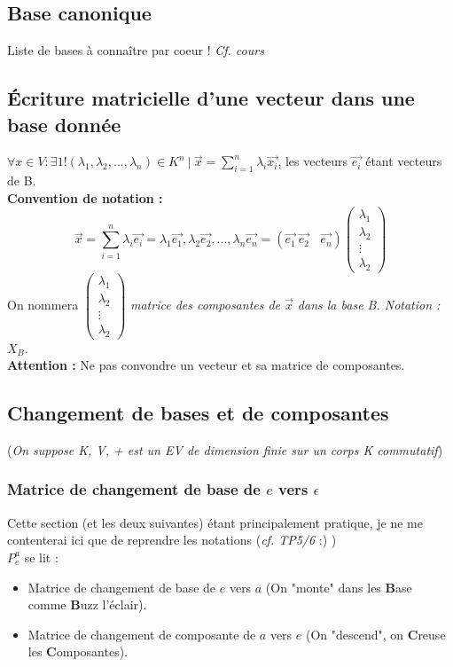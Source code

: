 \documentclass[12pt, a4paper, openany]{article}
\begin{document}
\subsection{Base canonique}
Liste de bases à connaître par coeur ! \textit{Cf. cours}

\subsection{Écriture matricielle d'une vecteur dans une base donnée}
$\forall x \in V : \exists 1!(\lambda_{1}, \lambda_{2}, ..., \lambda_{n}) \in K^{n}\ |\ \vec{x} = \sum_{i=1}^{n} \lambda_{i}\vec{x_{i}}$, les vecteurs $\vec{e_{i}}$ étant vecteurs de B.\\
\textbf{Convention de notation :}\\
$$\vec{x} = \sum_{i=1}^{n}  \lambda_{i}\vec{e_{i}} = \lambda_{1}\vec{e_{1}}, \lambda_{2}\vec{e_{2}}, ..., \lambda_{n}\vec{e_{n}} = (\vec{e_{1}}\ \vec{e_{2}}\ \ \ \ \vec{e_{n}})\begin{pmatrix} 
\lambda_1 \\ 
\lambda_2 \\ 
\vdots\\ 
\lambda_2 \end{pmatrix}$$
On nommera $\begin{pmatrix} 
\lambda_1 \\ 
\lambda_2 \\ 
\vdots\\ 
\lambda_2 \end{pmatrix}$ \textit{matrice des composantes de $\vec{x}$ dans la base B. Notation : $X_B$}.
\\
\textbf{Attention :} Ne pas convondre un vecteur et sa matrice de 
composantes.


\subsection{Changement de bases et de composantes}
(\textit{On suppose K, V, + est un EV de dimension finie sur un corps K commutatif})\\
\subsubsection{Matrice de changement de base de $e$ vers $\epsilon$}
Cette section (et les deux suivantes) étant principalement pratique, je ne me contenterai ici que de reprendre les notations (\textit{cf. TP5/6} :) )\\
$P_e^a$ se lit :
\begin{itemize}
\item Matrice de changement de base de $e$ vers $a$ (On "monte" dans les \textbf{B}ase comme \textbf{B}uzz l'éclair).
\item Matrice de changement de composante de $a$ vers $e$ (On "descend", on \textbf{C}reuse les \textbf{C}omposantes).
\end{itemize}
\end{document}
